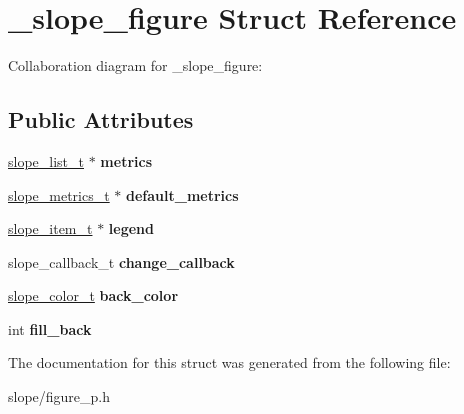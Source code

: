 \hypertarget{struct__slope__figure}{\section{\+\_\+slope\+\_\+figure Struct Reference}
\label{struct__slope__figure}
}


Collaboration diagram for \+\_\+slope\+\_\+figure\+:
\subsection*{Public Attributes}
\begin{DoxyCompactItemize}
\item 
\hypertarget{struct__slope__figure_a783cd1c9b86d7ddc6997a4b7e51b80df}{\hyperlink{group__List_ga88326d377deca937191acac6784bff0e}{slope\+\_\+list\+\_\+t} $\ast$ {\bfseries metrics}}\label{struct__slope__figure_a783cd1c9b86d7ddc6997a4b7e51b80df}

\item 
\hypertarget{struct__slope__figure_a76f248fab4d59b4170709525bca5883c}{\hyperlink{group__Metrics_gab80787ee8ae8dc449e770249fe0e3c35}{slope\+\_\+metrics\+\_\+t} $\ast$ {\bfseries default\+\_\+metrics}}\label{struct__slope__figure_a76f248fab4d59b4170709525bca5883c}

\item 
\hypertarget{struct__slope__figure_ad5e0bd96cade55ef42f5a954322b0ac1}{\hyperlink{group__Item_ga2616141f0e164a876049da51ea3a8646}{slope\+\_\+item\+\_\+t} $\ast$ {\bfseries legend}}\label{struct__slope__figure_ad5e0bd96cade55ef42f5a954322b0ac1}

\item 
\hypertarget{struct__slope__figure_ab4d6de431e6f0b4a97b780b606ae0da3}{slope\+\_\+callback\+\_\+t {\bfseries change\+\_\+callback}}\label{struct__slope__figure_ab4d6de431e6f0b4a97b780b606ae0da3}

\item 
\hypertarget{struct__slope__figure_afce997af5c45b99ba7f123d40b5d0975}{\hyperlink{struct__slope__color}{slope\+\_\+color\+\_\+t} {\bfseries back\+\_\+color}}\label{struct__slope__figure_afce997af5c45b99ba7f123d40b5d0975}

\item 
\hypertarget{struct__slope__figure_ac29b1eb35fd245cf8603548bf360f415}{int {\bfseries fill\+\_\+back}}\label{struct__slope__figure_ac29b1eb35fd245cf8603548bf360f415}

\end{DoxyCompactItemize}


The documentation for this struct was generated from the following file\+:\begin{DoxyCompactItemize}
\item 
slope/figure\+\_\+p.\+h\end{DoxyCompactItemize}
